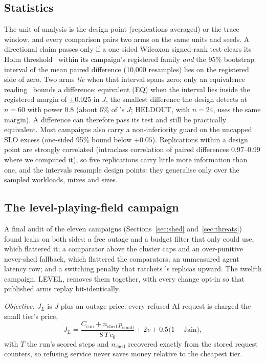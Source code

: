 \subsection{Statistics}
\label{sec:stats}

The unit of analysis is the design point (replications averaged) or the
trace window, and every comparison pairs two arms on the same units and
seeds. A directional claim passes only if a one-sided Wilcoxon signed-rank
test clears its Holm threshold~\cite{holm1979} within its campaign's
registered family \emph{and} the 95\% bootstrap interval of the mean paired
difference (10{,}000 resamples) lies on the registered side of zero. Two
arms \emph{tie} when that interval spans zero; only an equivalence
reading~\cite{lakens2017} bounds a difference: equivalent (EQ) when the
interval lies inside the registered margin of $\pm0.025$ in $J$, the
smallest difference the design detects at $n=60$ with power 0.8 (about 6\%
of \jcac{}'s $J$; HELDOUT, with $n=24$, uses the same margin). A difference
can therefore pass its test and still be practically equivalent. Most
campaigns also carry a non-inferiority guard on the uncapped SLO excess
(one-sided 95\% bound below $+0.05$). Replications within a design point
are strongly correlated (intraclass correlation of paired differences
0.97--0.99 where we computed it), so five replications carry little more
information than one, and the intervals resample design points: they
generalise only over the sampled workloads, mixes and sizes.

\subsection{The level-playing-field campaign}
\label{sec:levelmethod}

A final audit of the eleven campaigns (Sections~\ref{sec:shed}
and~\ref{sec:threats}) found leaks on both sides: a free outage and a budget
filter that only \jcac{} could use, which flattered it; a comparator above
the cluster caps and an over-punitive never-shed fallback, which flattered
the comparators; an unmeasured agent latency row; and a switching penalty
that ratchets \jcac{}'s replicas upward. The twelfth campaign, LEVEL, removes
them together, with every change opt-in so that published arms replay
bit-identically.

\emph{Objective.} $J_L$ is $J$ plus an outage price: every refused AI
request is charged the small tier's price,
\begin{equation}
\label{eq:JL}
J_L = \frac{C_{\mathrm{run}} + n_{\mathrm{shed}}\,p_{\mathrm{small}}}{8\,T\,c_0}
      + 2\bar v + 0.5\bigl(1-\overline{\mathrm{Jain}}\bigr),
\end{equation}
with $T$ the run's scored steps and $n_{\mathrm{shed}}$ recovered exactly
from the stored request counters, so refusing service never saves money
relative to the cheapest tier.

